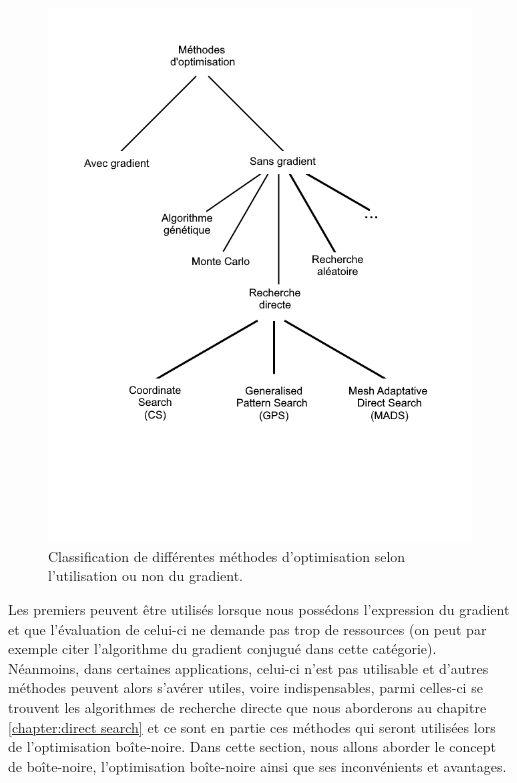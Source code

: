 \documentclass[french]{report}
\begin{document}
\begin{figure}[htbp]
    \centering
    \includegraphics[width=13cm]{classification.png}
    \caption{Classification de différentes méthodes d'optimisation selon l'utilisation ou non du gradient.}
    \label{fig:classification_methode_opti}
\end{figure}

Les premiers peuvent être utilisés lorsque nous possédons l'expression du gradient et que l'évaluation de celui-ci ne demande pas trop de ressources (on peut par exemple citer l'algorithme du gradient conjugué dans cette catégorie). Néanmoins, dans certaines applications, celui-ci n'est pas utilisable et d'autres méthodes peuvent alors s'avérer utiles, voire indispensables, parmi celles-ci se trouvent les algorithmes de recherche directe que nous aborderons au chapitre \ref{chapter:direct search} et ce sont en partie ces méthodes qui seront utilisées lors de l'optimisation boîte-noire.
Dans cette section, nous allons aborder le concept de boîte-noire, l'optimisation boîte-noire ainsi que ses inconvénients et avantages.
\end{document}

